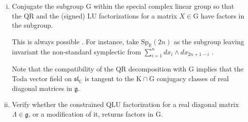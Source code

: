 \documentclass[reqno]{amsart}
\renewcommand{\gg}{\mathfrak{g}}
\renewcommand{\sl}{\mathfrak{sl}}
\newcommand{\R}{\mathbb{R}}
\newcommand{\C}{\mathbb{C}}
\theoremstyle{definition} %
\begin{document}
\begin{enumerate}[(i)]
 \item Conjugate the subgroup $\mathrm{G}$ within the  special complex linear group so that the $\mathrm{QR}$ and the (signed) $\mathrm{LU}$ factorizations for a matrix $X\in \mathrm{G}$ have factors in the subgroup.

 This is always possible \cite{Sa,MT2}. For instance, take $\mathrm{Sp}_\R(2n)$ as the subgroup leaving invariant the non-standard symplectic from  $\sum_{i=1}^n dx_i\wedge dx_{2n+1-i}$ \cite[Table 1]{Sa}.

 Note that the compatibility of the $\mathrm{QR}$ decomposition with $\mathrm{G}$ implies that the Toda vector field on $\sl_\C$ is tangent to the $\mathrm{K}\cap \mathrm{G}$ conjugacy classes of real diagonal matrices in $\gg$.
 \item Verify whether the constrained $\mathrm{QLU}$ factorization for a real diagonal matrix $\Lambda\in \gg$, or a modification of it, returns factors in $\mathrm{G}$.


\end{enumerate}
\end{document}
